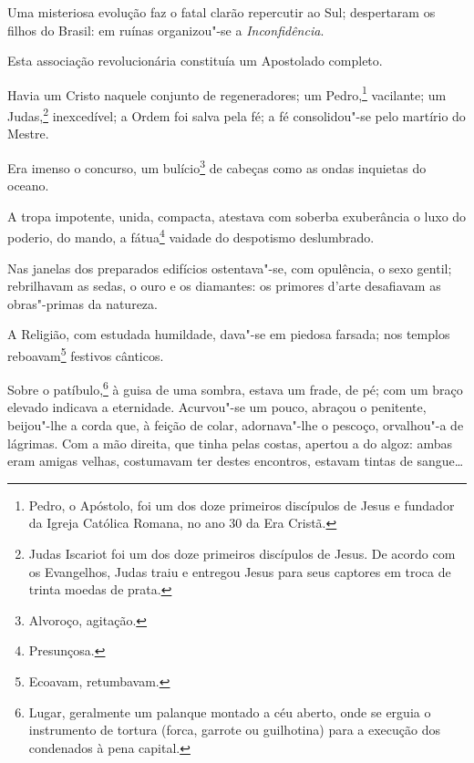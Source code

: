 Uma misteriosa evolução faz o fatal clarão repercutir ao Sul;
despertaram os filhos do Brasil: em ruínas organizou"-se a
\emph{Inconfidência}.

Esta associação revolucionária constituía um Apostolado completo.

Havia um Cristo naquele conjunto de regeneradores; um Pedro,\footnote{
  Pedro, o Apóstolo, foi um dos doze primeiros discípulos de Jesus e
  fundador da Igreja Católica Romana, no ano 30 da Era Cristã.}
vacilante; um Judas,\footnote{Judas Iscariot foi um dos doze primeiros
  discípulos de Jesus. De acordo com os Evangelhos, Judas traiu e
  entregou Jesus para seus captores em troca de trinta moedas de prata.}
inexcedível; a Ordem foi salva pela fé; a fé consolidou"-se pelo martírio
do Mestre.



Era imenso o concurso, um bulício\footnote{Alvoroço, agitação.} de
cabeças como as ondas inquietas do oceano.

A tropa impotente, unida, compacta, atestava com soberba exuberância o
luxo do poderio, do mando, a fátua\footnote{Presunçosa.} vaidade do
despotismo deslumbrado.

Nas janelas dos preparados edifícios ostentava"-se, com opulência, o sexo
gentil; rebrilhavam as sedas, o ouro e os diamantes: os primores d'arte
desafiavam as obras"-primas da natureza.

A Religião, com estudada humildade, dava"-se em piedosa farsada; nos
templos reboavam\footnote{Ecoavam, retumbavam.} festivos cânticos.

Sobre o patíbulo,\footnote{Lugar, geralmente um palanque montado a céu
  aberto, onde se erguia o instrumento de tortura (forca, garrote ou
  guilhotina) para a execução dos condenados à pena capital.} à guisa
de uma sombra, estava um frade, de pé; com um braço elevado indicava a
eternidade. Acurvou"-se um pouco, abraçou o penitente, beijou"-lhe a corda
que, à feição de colar, adornava"-lhe o pescoço, orvalhou"-a de lágrimas.
Com a mão direita, que tinha pelas costas, apertou a do algoz: ambas
eram amigas velhas, costumavam ter destes encontros, estavam tintas de
sangue\ldots{}

